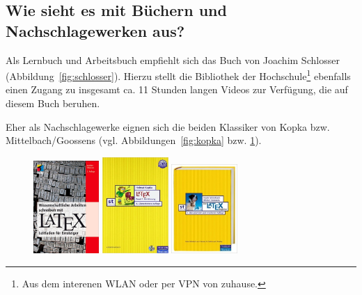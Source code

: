 \documentclass[pdftex,abstracton,a4paper]{scrartcl}
\begin{document}
\subsection{Wie sieht es mit Büchern und Nachschlagewerken aus?}

Als Lernbuch und Arbeitsbuch empfiehlt sich das Buch von Joachim Schlosser (Abbildung~\ref{fig:schlosser}). Hierzu stellt die Bibliothek der Hochschule\footnote{Aus dem interenen WLAN oder per VPN von zuhause.} ebenfalls einen Zugang zu insgesamt ca. 11 Stunden langen Videos\autocite{schlosser:latex_tutorium} zur Verfügung, die auf diesem Buch beruhen.

Eher als Nachschlagewerke eignen sich die beiden Klassiker von Kopka bzw. Mittelbach/Goossens (vgl. Abbildungen~\ref{fig:kopka} bzw. \ref{fig:mittelbach_goossens}).

\begin{figure}[h!tbp]
\centering
\begin{minipage}[b]{0.3\textwidth}
\centering
\includegraphics[width=2.5cm]{images/schlosser_latex_buch}
\caption{\autocite{schlosser:latex_buch}}
\label{fig:schlosser}
\end{minipage}
\hfill
\begin{minipage}[b]{0.3\textwidth}
\centering
\includegraphics[width=2.5cm]{images/kopka_latex}
\caption{\autocite{kopka:latex}}
\label{fig:kopka}
\end{minipage}
\hfill
\begin{minipage}[b]{0.3\textwidth}
\centering
\includegraphics[width=2.5cm]{images/mittelbach_goossens_latex_begleiter}
\caption{\autocite{mittelbach_goossens:latex_begleiter}}
\label{fig:mittelbach_goossens}
\end{minipage}
\end{figure}
\end{document}
